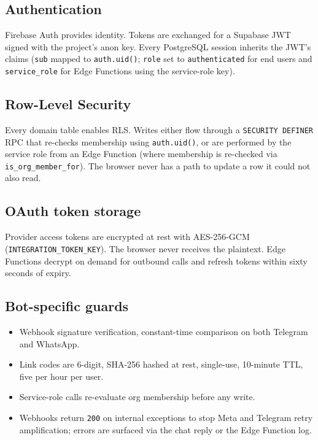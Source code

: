 \documentclass[11pt,a4paper,oneside]{article}
\newcommand{\code}[1]{\texttt{\small #1}}
\begin{document}
\subsection{Authentication}

Firebase Auth provides identity. Tokens are exchanged for a Supabase
JWT signed with the project's anon key. Every PostgreSQL session
inherits the JWT's claims (\code{sub} mapped to \code{auth.uid()};
\code{role} set to \code{authenticated} for end users and
\code{service\_role} for Edge Functions using the service-role key).

\subsection{Row-Level Security}

Every domain table enables RLS. Writes either flow through a
\code{SECURITY DEFINER} RPC that re-checks membership using
\code{auth.uid()}, or are performed by the service role from an Edge
Function (where membership is re-checked via
\code{is\_org\_member\_for}). The browser never has a path to update a
row it could not also read.

\subsection{OAuth token storage}

Provider access tokens are encrypted at rest with AES-256-GCM
(\code{INTEGRATION\_TOKEN\_KEY}). The browser never receives the
plaintext. Edge Functions decrypt on demand for outbound calls and
refresh tokens within sixty seconds of expiry.

\subsection{Bot-specific guards}

\begin{itemize}
  \item Webhook signature verification, constant-time comparison on
    both Telegram and WhatsApp.
  \item Link codes are 6-digit, SHA-256 hashed at rest, single-use,
    10-minute TTL, five per hour per user.
  \item Service-role calls re-evaluate org membership before any
    write.
  \item Webhooks return \code{200} on internal exceptions to stop
    Meta and Telegram retry amplification; errors are surfaced via the
    chat reply or the Edge Function log.
\end{itemize}
\end{document}
